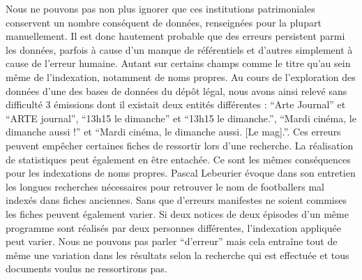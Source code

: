 
Nous ne pouvons pas non plus ignorer que ces institutions patrimoniales conservent un nombre conséquent de données, renseignées pour la plupart manuellement. Il est donc hautement probable que des erreurs persistent parmi les données, parfois à cause d'un manque de référentiels et d'autres simplement à cause de l'erreur humaine. Autant sur certains champs comme le titre qu'au sein même de l'indexation, notamment de noms propres. Au cours de l'exploration des données d'une des bases de données du dépôt légal, nous avons ainsi relevé sans difficulté 3 émissions dont il existait deux entités différentes : \enquote{Arte Journal} et \enquote{ARTE journal}, \enquote{13h15 le dimanche} et \enquote{13h15 le dimanche.}, \enquote{Mardi cinéma, le dimanche aussi !} et \enquote{Mardi cinéma, le dimanche aussi. [Le mag].}. Ces erreurs peuvent empêcher certaines fiches de ressortir lors d'une recherche. La réalisation de statistiques peut également en être entachée. Ce sont les mêmes conséquences pour les indexations de noms propres. Pascal Lebeurier évoque dans son entretien les longues recherches nécessaires pour retrouver le nom de footballers mal indexés dans fiches anciennes. Sans que d'erreurs manifestes ne soient commises les fiches peuvent également varier. Si deux notices de deux épisodes d'un même programme sont réalisés par deux personnes différentes, l'indexation appliquée peut varier. Nous ne pouvons pas parler \enquote{d'erreur} mais cela entraîne tout de même une variation dans les résultats selon la recherche qui est effectuée et tous documents voulus ne ressortirons pas. 